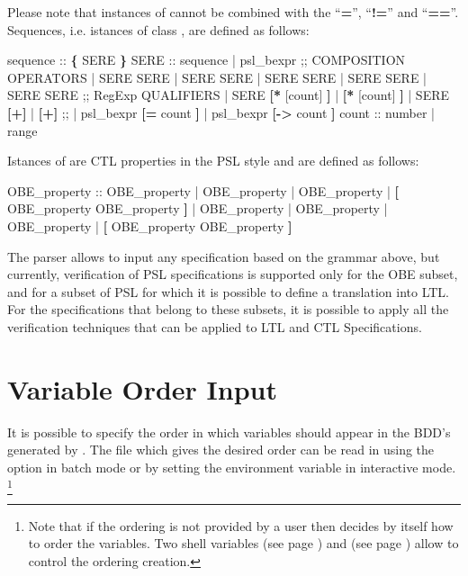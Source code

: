 %
Please note that instances of  cannot be combined
with the ``\textbf{=}'', ``\textbf{!=}'' and ``\textbf{==}''.\\
%
Sequences, i.e. istances of class , are defined as follows:
%
\begin{Grammar}
sequence ::
   \textbf{\{} SERE \textbf{\}}
SERE ::
   sequence
 | psl_bexpr
 ;; COMPOSITION OPERATORS
 | SERE \operator{;} SERE
 | SERE \operator{:} SERE
 | SERE \operator{&} SERE
 | SERE \operator{&&} SERE
 | SERE \operator{|} SERE
 ;; RegExp QUALIFIERS
 | SERE \textbf{[*} [count] \textbf{]}
 | \textbf{[*} [count] \textbf{]}
 | SERE \textbf{[+]}
 | \textbf{[+]}
 ;;
 | psl_bexpr \textbf{[=} count \textbf{]}
 | psl_bexpr \textbf{[->} count \textbf{]}
count ::
   number
 | range
\end{Grammar}
%
Istances of  are CTL properties in the PSL style
and are defined as follows:
%
\begin{Grammar}
OBE_property ::
    OBE_property
 |  OBE_property
 |  OBE_property
 |  \textbf{[} OBE_property  OBE_property \textbf{]}
 |  OBE_property
 |  OBE_property
 |  OBE_property
 |  \textbf{[} OBE_property  OBE_property \textbf{]}
\end{Grammar}
%
The \nusmv parser allows to input any specification based on the
grammar above, but currently, verification of PSL specifications is
supported only for the OBE subset, and for a subset of PSL for
which it is possible to define a translation into LTL. For the
specifications that belong to these subsets, it is possible to apply
all the verification techniques that can be applied to LTL and CTL
Specifications.


\section{Variable Order Input}
\label{Variable::Order::Input}
%
It is possible to specify the order in which variables should appear
in the BDD's generated by \nusmv.
%
The file which gives the desired order can be read in using the
 option in batch mode or by setting the
 environment variable in interactive mode.
%
 \footnote{Note that if the ordering is not provided by a user then
 \nusmv decides by itself how to order the variables. Two shell
 variables  (see page
 \pageref{bdd_static_order_heuristics}) and
  (see page \pageref{vars_order_type}) allow
 to control the ordering creation.}

